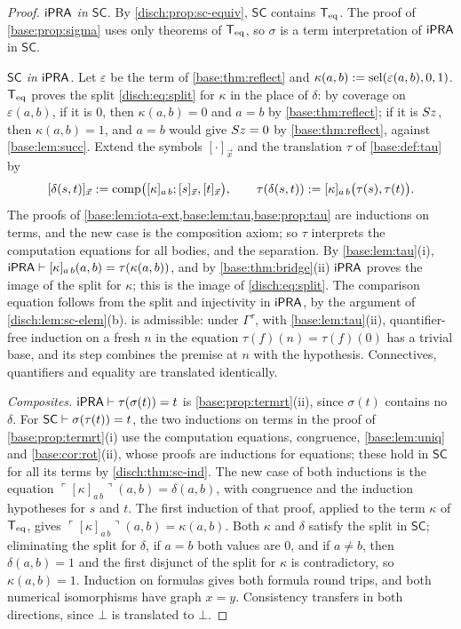 \begin{proof}
\emph{$\mathsf{iPRA}$ in $\mathsf{SC}$.} By \cref{disch:prop:sc-equiv}, $\mathsf{SC}$
contains $\mathsf{T}_{\mathrm{eq}}$. The proof of \cref{base:prop:sigma} uses only theorems of
$\mathsf{T}_{\mathrm{eq}}$, so $\sigma$ is a term interpretation of $\mathsf{iPRA}$ in $\mathsf{SC}$.

\emph{$\mathsf{SC}$ in $\mathsf{iPRA}$.} Let $\varepsilon$ be the term of
\cref{base:thm:reflect} and $\kappa(a,b)\mathrel{:=}\operatorname{sel}(\varepsilon(a,b),0,1)$.
$\mathsf{T}_{\mathrm{eq}}$ proves the split \eqref{disch:eq:split} for $\kappa$ in the place of
$\delta$: by coverage on $\varepsilon(a,b)$, if it is $0$, then
$\kappa(a,b)=0$ and $a=b$ by \cref{base:thm:reflect}; if it is $S z$, then
$\kappa(a,b)=1$, and $a=b$ would give $S z=0$ by
\cref{base:thm:reflect}, against \cref{base:lem:succ}. Extend the symbols
$[\cdot]_{\vec x}$ and the translation $\tau$ of \cref{base:def:tau} by
\[
 [\delta(s,t)]_{\vec x}\mathrel{:=}
 \mathrm{comp}\bigl([\kappa]_{a\,b};[s]_{\vec x},[t]_{\vec x}\bigr),\qquad
 \tau(\delta(s,t))\mathrel{:=}[\kappa]_{a\,b}\bigl(\tau(s),\tau(t)\bigr).
\]
The proofs of \cref{base:lem:iota-ext,base:lem:tau,base:prop:tau} are
inductions on terms, and the new case is the composition axiom; so $\tau$
interprets the computation equations for all bodies, and the separation. By
\cref{base:lem:tau}(i), $\mathsf{iPRA}\vdash[\kappa]_{a\,b}(a,b)=\tau(\kappa(a,b))$,
and by \cref{base:thm:bridge}(ii) $\mathsf{iPRA}$ proves the image of the split for
$\kappa$; this is the image of \eqref{disch:eq:split}. The comparison
equation follows from the split and injectivity in $\mathsf{iPRA}$, by the
argument of \cref{disch:lem:sc-elem}(b).  is admissible:
under $\Gamma^\tau$, with \cref{base:lem:tau}(ii), quantifier-free induction
on a fresh $n$ in the equation $\tau(f)(n)=\tau(f)(0)$ has a trivial base,
and its step combines the premise at $n$ with the hypothesis. Connectives,
quantifiers and equality are translated identically.

\emph{Composites.} $\mathsf{iPRA}\vdash\tau(\sigma(t))=t$ is
\cref{base:prop:termrt}(ii), since $\sigma(t)$ contains no $\delta$. For
$\mathsf{SC}\vdash\sigma(\tau(t))=t$, the two inductions on terms in the
proof of \cref{base:prop:termrt}(i) use the computation equations,
congruence, \cref{base:lem:uniq} and \cref{base:cor:rot}(ii), whose proofs
are inductions for equations; these hold in $\mathsf{SC}$ for all its terms
by \cref{disch:thm:sc-ind}. The new case of both inductions is the equation
$\ulcorner[\kappa]_{a\,b}\urcorner(a,b)=\delta(a,b)$, with congruence and
the induction hypotheses for $s$ and $t$. The first induction of that
proof, applied to the term $\kappa$ of $\mathsf{T}_{\mathrm{eq}}$, gives
$\ulcorner[\kappa]_{a\,b}\urcorner(a,b)=\kappa(a,b)$. Both $\kappa$ and $\delta$
satisfy the split in $\mathsf{SC}$; eliminating the split for $\delta$, if
$a=b$ both values are $0$, and if $a\neq b$, then $\delta(a,b)=1$ and the
first disjunct of the split for $\kappa$ is contradictory, so
$\kappa(a,b)=1$. Induction on formulas gives both formula round trips, and
both numerical isomorphisms have graph $x=y$. Consistency transfers in both
directions, since $\bot$ is translated to $\bot$.
\end{proof}

